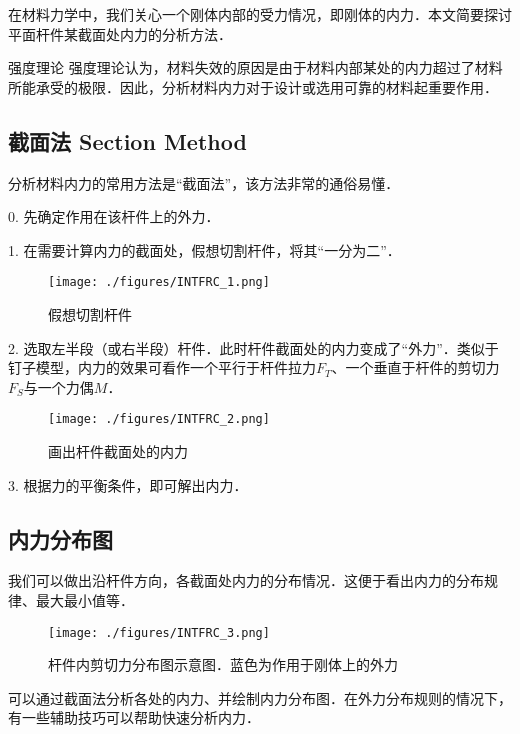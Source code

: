 在材料力学中，我们关心一个刚体内部的受力情况，即刚体的内力．本文简要探讨平面杆件某截面处内力的分析方法．

\begin{example}{强度理论}
强度理论认为，材料失效的原因是由于材料内部某处的内力超过了材料所能承受的极限．因此，分析材料内力对于设计或选用可靠的材料起重要作用．
\end{example}

\subsection{截面法 Section Method}
分析材料内力的常用方法是“截面法”，该方法非常的通俗易懂．

0. 先确定作用在该杆件上的外力．

1. 在需要计算内力的截面处，假想切割杆件，将其“一分为二”．
\begin{figure}[ht]
\centering
\texttt{[image: ./figures/INTFRC\_1.png]}
\caption{假想切割杆件} \label{INTFRC_fig1}
\end{figure}

2. 选取左半段（或右半段）杆件．此时杆件截面处的内力变成了“外力”．类似于钉子模型，内力的效果可看作一个平行于杆件拉力$F_T$、一个垂直于杆件的剪切力$F_S$与一个力偶$M$．
\begin{figure}[ht]
\centering
\texttt{[image: ./figures/INTFRC\_2.png]}
\caption{画出杆件截面处的内力} \label{INTFRC_fig2}
\end{figure}

3. 根据力的平衡条件，即可解出内力．

\subsection{内力分布图}
我们可以做出沿杆件方向，各截面处内力的分布情况．这便于看出内力的分布规律、最大最小值等．
\begin{figure}[ht]
\centering
\texttt{[image: ./figures/INTFRC\_3.png]}
\caption{杆件内剪切力分布图示意图．蓝色为作用于刚体上的外力} \label{INTFRC_fig3}
\end{figure}

可以通过截面法分析各处的内力、并绘制内力分布图．在外力分布规则的情况下，有一些辅助技巧可以帮助快速分析内力．

